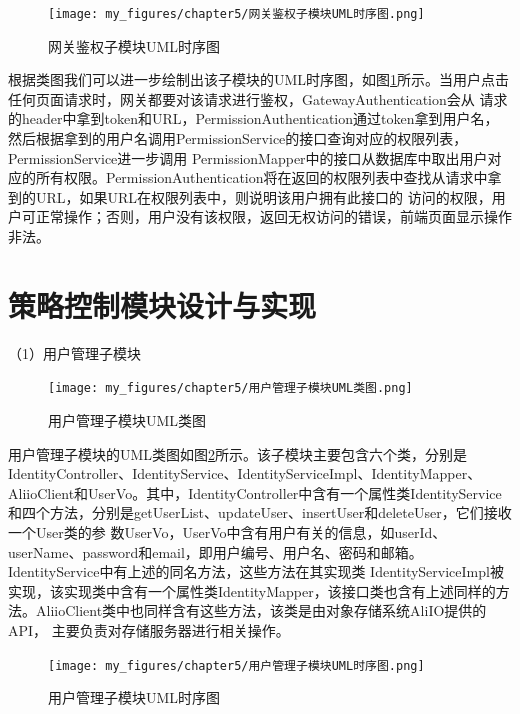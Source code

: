 \begin{figure}[htb]
    \centering
    \texttt{[image: my\_figures/chapter5/网关鉴权子模块UML时序图.png]}
    \caption{网关鉴权子模块UML时序图}
    \label{fig:网关鉴权子模块UML时序图}
\end{figure}


根据类图我们可以进一步绘制出该子模块的UML时序图，如图\ref{fig:网关鉴权子模块UML时序图}所示。当用户点击任何页面请求时，网关都要对该请求进行鉴权，GatewayAuthentication会从
请求的header中拿到token和URL，PermissionAuthentication通过token拿到用户名，然后根据拿到的用户名调用PermissionService的接口查询对应的权限列表，PermissionService进一步调用
PermissionMapper中的接口从数据库中取出用户对应的所有权限。PermissionAuthentication将在返回的权限列表中查找从请求中拿到的URL，如果URL在权限列表中，则说明该用户拥有此接口的
访问的权限，用户可正常操作；否则，用户没有该权限，返回无权访问的错误，前端页面显示操作非法。



\section{策略控制模块设计与实现}

（1）用户管理子模块

\begin{figure}[htb]
    \centering
    \texttt{[image: my\_figures/chapter5/用户管理子模块UML类图.png]}
    \caption{用户管理子模块UML类图}
    \label{fig:用户管理子模块UML类图}
\end{figure}

用户管理子模块的UML类图如图\ref{fig:用户管理子模块UML类图}所示。该子模块主要包含六个类，分别是IdentityController、IdentityService、IdentityServiceImpl、IdentityMapper、 
AliioClient和UserVo。其中，IdentityController中含有一个属性类IdentityService和四个方法，分别是getUserList、updateUser、insertUser和deleteUser，它们接收一个User类的参
数UserVo，UserVo中含有用户有关的信息，如userId、userName、password和email，即用户编号、用户名、密码和邮箱。IdentityService中有上述的同名方法，这些方法在其实现类
IdentityServiceImpl被实现，该实现类中含有一个属性类IdentityMapper，该接口类也含有上述同样的方法。AliioClient类中也同样含有这些方法，该类是由对象存储系统AliIO提供的API，
主要负责对存储服务器进行相关操作。

\begin{figure}[htb]
    \centering
    \texttt{[image: my\_figures/chapter5/用户管理子模块UML时序图.png]}
    \caption{用户管理子模块UML时序图}
    \label{fig:用户管理子模块UML时序图}
\end{figure}

